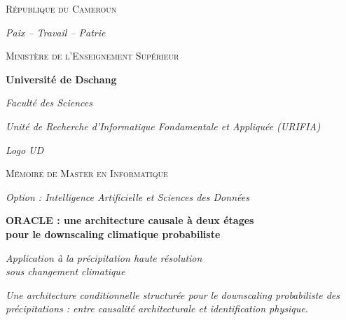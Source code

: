 \documentclass[14pt,a4paper,openany]{extreport}
\theoremstyle{definition}
\begin{document}

\thispagestyle{empty}
\begin{titlepage}
\centering

{\large \textsc{République du Cameroun} \par}
\vspace{0.2em}
{\small \textit{Paix -- Travail -- Patrie} \par}
\vspace{0.5em}
{\large \textsc{Ministère de l'Enseignement Supérieur} \par}
\vspace{0.5em}
{\large \textbf{Université de Dschang} \par}
\vspace{0.3em}
{\large \textit{Faculté des Sciences} \par}
\vspace{0.3em}
{\large \textit{Unité de Recherche d'Informatique Fondamentale et Appliquée (URIFIA)} \par}

\vspace{2em}
\begin{tcolorbox}[width=4cm,height=4cm,valign=center,colback=gray!10,colframe=gray!50,arc=2pt]
\centering\small\textit{Logo UD}
\end{tcolorbox}

\vspace{2em}
{\Large \textsc{Mémoire de Master en Informatique} \par}
\vspace{0.5em}
{\large \textit{Option : Intelligence Artificielle et Sciences des Données} \par}

\vspace{2.5em}
\begin{tcolorbox}[colback=uridarkblue!5,colframe=uridarkblue,boxrule=1pt,arc=2pt,
                  left=0.5em,right=0.5em,top=0.8em,bottom=0.8em]
\centering
{\LARGE\bfseries\color{uridarkblue}
ORACLE : une architecture causale à deux étages\\pour le downscaling climatique probabiliste \par}
\vspace{0.8em}
{\large\itshape Application à la précipitation haute résolution\\sous changement climatique \par}
\vspace{0.8em}
{\normalsize\itshape Une architecture conditionnelle structurée pour le downscaling probabiliste des précipitations : entre causalité architecturale et identification physique. \par}
\end{tcolorbox}


\end{titlepage}
\end{document}
